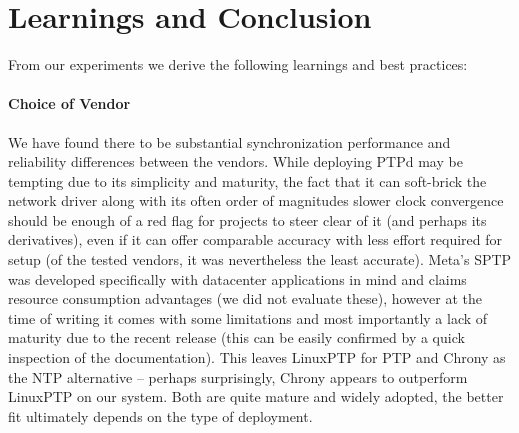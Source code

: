 
\section{Learnings and Conclusion}
From our experiments we derive the following learnings and best practices:

\paragraph{Choice of Vendor} We have found there to be substantial synchronization performance and reliability differences between the vendors. While deploying PTPd may be tempting due to its simplicity and maturity, the fact that it can soft-brick the network driver along with its often order of magnitudes slower clock convergence should be enough of a red flag for projects to steer clear of it (and perhaps its derivatives), even if it can offer comparable accuracy with less effort required for setup (of the tested vendors, it was nevertheless the least accurate). Meta's SPTP was developed specifically with datacenter applications in mind and claims resource consumption advantages (we did not evaluate these), however at the time of writing it comes with some limitations and most importantly a lack of maturity due to the recent release (this can be easily confirmed by a quick inspection of the documentation). This leaves LinuxPTP for PTP and Chrony as the NTP alternative -- perhaps surprisingly, Chrony appears to outperform LinuxPTP on our system. Both are quite mature and widely adopted, the better fit ultimately depends on the type of deployment.

